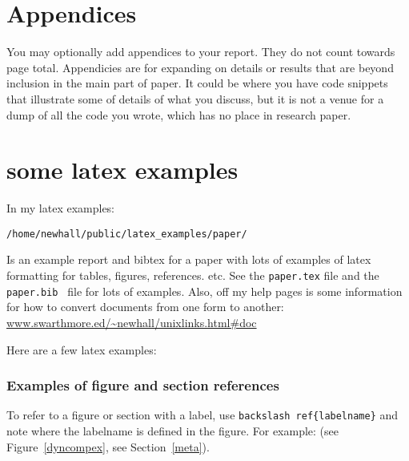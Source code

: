 \documentclass[11pt,twocolumn]{article}
\begin{document}



\newpage 
\onecolumn
\section{Appendices}\label{appx} 

You may optionally add appendices to your report.  They do not count towards
page total.  Appendicies are for expanding on details or results that are
beyond inclusion in the main part of paper.  It could be where you have code
snippets that illustrate some of details of what you discuss, but it is not a
venue for a dump of all the code you wrote, which has no place in research
paper.  


\newpage
\twocolumn
\section{some latex examples}

In my latex examples:
\begin{verbatim}
/home/newhall/public/latex_examples/paper/
\end{verbatim}
Is an example report and bibtex for a paper with lots of examples
of latex formatting for tables, figures, references. etc.  See 
the {\tt paper.tex} file and the {\tt paper.bib } file for lots of
examples. Also, off my   help pages is some information for how to 
convert documents from one form to another: 
{\small \url{www.swarthmore.ed/~newhall/unixlinks.html#doc} }

Here are a few latex examples:

\subsubsection{Examples of figure and section references}

To refer to a figure or section with a label, 
use {\tt backslash ref\{labelname\}} and note where the labelname is 
defined in the figure.  For example: (see Figure~\ref{dyncompex}, see 
Section~\ref{meta}). 
\end{document}
